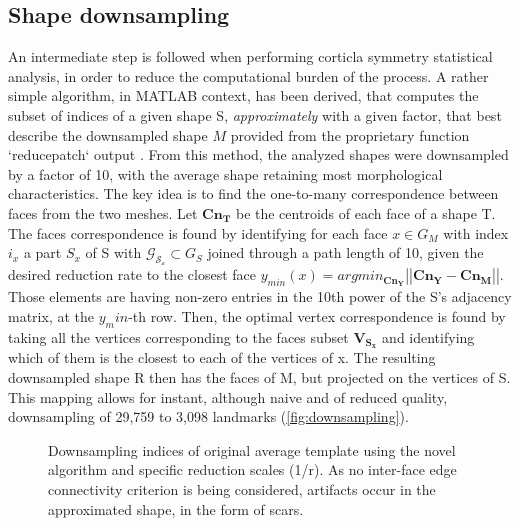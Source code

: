 \subsection{Shape downsampling}
\label{subsec:downsampling}
An intermediate step is followed when performing corticla symmetry statistical analysis, in order to reduce the computational burden of the process. A rather simple algorithm, in MATLAB context, has been derived, that computes the subset of indices of a given shape S, \textit{approximately} with a given factor, that best describe the downsampled shape $M$ provided from the  proprietary function `reducepatch` output \cite{Lopez2014}. From this method, the analyzed shapes were downsampled by a factor of 10, with the average shape retaining most morphological characteristics. The key idea is to find the one-to-many correspondence between faces from the two meshes. Let $\mathbf{{Cn}_T}$ be the centroids of each face of a shape T. The faces correspondence is found by identifying for each face $x\in G_M$ with index $i_x$ a part $S_x$ of S with $\mathcal{G_{S_x}}\subset G_S$ joined through a path length of 10, given the desired reduction rate to the closest face $y_{min}(x)=argmin_{\mathbf{{Cn}_Y}}\left|\left|\mathbf{{Cn}_Y}-\mathbf{{Cn}_M}\right|\right|$. Those elements are having non-zero entries in the 10th power of the S's adjacency matrix, at the $y_min$-th row. Then, the optimal vertex correspondence is found by taking all the vertices corresponding to the faces subset $\mathbf{V_{S_x}}$ and identifying which of them is the closest to each of the vertices of x. The resulting downsampled shape R then has the faces of M, but projected on the vertices of S. This mapping allows for instant, although naive and of reduced quality, downsampling of 29,759 to 3,098 landmarks (\autoref{fig:downsampling}).
\begin{figure}[H]
	\centering
	
	\caption{Downsampling indices of original average template using the novel algorithm and specific reduction scales (1/r). As no inter-face edge connectivity criterion is being considered, artifacts occur in the approximated shape, in the form of scars.}
	\label{fig:downsampling}
\end{figure}

